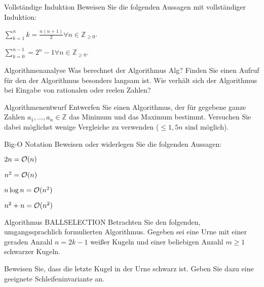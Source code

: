 \documentclass{exercisesheet}
\author{Leopold Lemmermann}
\begin{document}
\createtitle

\setcounter{section}{0}
\begin{eexercises}{Vollständige Induktion}{
    Beweisen Sie die folgenden Aussagen mit vollständiger Induktion:
  }
  \item $\sum_{k=1}^{n}{k} = \frac{n(n+1)}{2}\forall n \in \mathbb{Z}_{\geq 0}$.
  \item $\sum_{k=0}^{n-1} = 2^n-1\forall n \in \mathbb{Z}_{\geq 0}$.
\end{eexercises}

\begin{exercise}{Algorithmenanalyse}
  Was berechnet der Algorithmus Alg? Finden Sie einen Aufruf für den der Algorithmus besonders langsam ist. Wie verhält sich der Algorithmus bei Eingabe von rationalen oder reelen Zahlen?
  \begin{algorithm}[ht]
    \caption{Alg}
  \end{algorithm}
\end{exercise}

\begin{exercise}{Algorithmenentwurf}
  Entwerfen Sie einen Algorithmus, der für gegebene ganze Zahlen $a_1, \ldots, a_n \in \mathbb{Z}$ das Minimum und das Maximum bestimmt. Versuchen Sie dabei möglichst wenige Vergleiche zu verwenden ($\leq 1,5n$ sind möglich).
\end{exercise}

\newpage\setcounter{section}{1}\setcounter{subsection}{0}
\begin{eexercises}{Big-O Notation}{
    Beweisen oder widerlegen Sie die folgenden Aussagen:}
  \item $2n = \mathcal{O}(n)$
  \item $n^2 = \mathcal{O}(n)$
  \item $n \log n = \mathcal{O}(n^2)$
  \item $n^2 + n = \mathcal{O}(n^2)$
\end{eexercises}

\begin{exercise}{Algorithmus BALLSELECTION}
  Betrachten Sie den folgenden, umgangssprachlich formulierten Algorithmus. Gegeben sei eine Urne mit einer geraden Anzahl $n = 2k - 1$ weißer Kugeln und einer beliebigen Anzahl $m \geq 1$ schwarzer Kugeln.\par
  \begin{algorithm}[ht]
    \caption{BALLSELECTION}
  \end{algorithm}
  \noindent Beweisen Sie, dass die letzte Kugel in der Urne schwarz ist. Geben Sie dazu eine geeignete Schleifeninvariante an.
\end{exercise}
\end{document}
